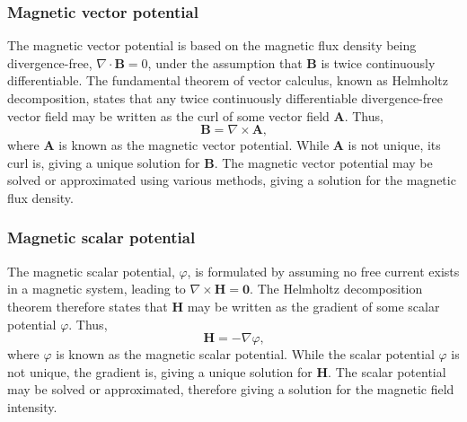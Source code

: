\subsubsection{Magnetic vector potential}
The magnetic vector potential is based on the magnetic flux density being divergence-free, \(\nabla \cdot \mathbf{B} = 0\), under the assumption that \(\mathbf{B}\) is twice continuously differentiable. The fundamental theorem of vector calculus, known as Helmholtz decomposition, states that any twice continuously differentiable divergence-free vector field may be written as the curl of some vector field \(\mathbf{A}\). Thus,
\begin{equation}
    \mathbf{B} = \nabla \times \mathbf{A} \text{,}
\end{equation}
where \(\mathbf{A}\) is known as the magnetic vector potential. While \(\mathbf{A}\) is not unique, its curl is, giving a unique solution for \(\mathbf{B}\). The magnetic vector potential may be solved or approximated using various methods, giving a solution for the magnetic flux density.

\subsubsection{Magnetic scalar potential}
The magnetic scalar potential, \(\varphi\), is formulated by assuming no free current exists in a magnetic system, leading to \(\nabla \times \mathbf{H} = \bm{0}\). The Helmholtz decomposition theorem therefore states that \(\mathbf{H}\) may be written as the gradient of some scalar potential \(\varphi\). Thus,
\begin{equation}
    \mathbf{H} = -\nabla \varphi \text{,}
\end{equation}
where \(\varphi\) is known as the magnetic scalar potential. While the scalar potential \(\varphi\) is not unique, the gradient is, giving a unique solution for \(\mathbf{H}\). The scalar potential may be solved or approximated, therefore giving a solution for the magnetic field intensity.

